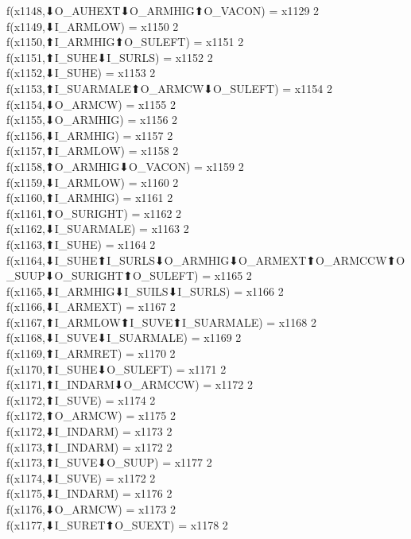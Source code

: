 f(x1148,⬇O_AUHEXT⬇O_ARMHIG⬆O_VACON) = x1129 {2} \\
f(x1149,⬇I_ARMLOW) = x1150 {2} \\
f(x1150,⬆I_ARMHIG⬆O_SULEFT) = x1151 {2} \\
f(x1151,⬆I_SUHE⬇I_SURLS) = x1152 {2} \\
f(x1152,⬇I_SUHE) = x1153 {2} \\
f(x1153,⬆I_SUARMALE⬆O_ARMCW⬇O_SULEFT) = x1154 {2} \\
f(x1154,⬇O_ARMCW) = x1155 {2} \\
f(x1155,⬇O_ARMHIG) = x1156 {2} \\
f(x1156,⬇I_ARMHIG) = x1157 {2} \\
f(x1157,⬆I_ARMLOW) = x1158 {2} \\
f(x1158,⬆O_ARMHIG⬇O_VACON) = x1159 {2} \\
f(x1159,⬇I_ARMLOW) = x1160 {2} \\
f(x1160,⬆I_ARMHIG) = x1161 {2} \\
f(x1161,⬆O_SURIGHT) = x1162 {2} \\
f(x1162,⬇I_SUARMALE) = x1163 {2} \\
f(x1163,⬆I_SUHE) = x1164 {2} \\
f(x1164,⬇I_SUHE⬆I_SURLS⬇O_ARMHIG⬇O_ARMEXT⬆O_ARMCCW⬆O_SUUP⬇O_SURIGHT⬆O_SULEFT) = x1165 {2} \\
f(x1165,⬇I_ARMHIG⬇I_SUILS⬇I_SURLS) = x1166 {2} \\
f(x1166,⬇I_ARMEXT) = x1167 {2} \\
f(x1167,⬆I_ARMLOW⬆I_SUVE⬆I_SUARMALE) = x1168 {2} \\
f(x1168,⬇I_SUVE⬇I_SUARMALE) = x1169 {2} \\
f(x1169,⬆I_ARMRET) = x1170 {2} \\
f(x1170,⬆I_SUHE⬇O_SULEFT) = x1171 {2} \\
f(x1171,⬆I_INDARM⬇O_ARMCCW) = x1172 {2} \\
f(x1172,⬆I_SUVE) = x1174 {2} \\
f(x1172,⬆O_ARMCW) = x1175 {2} \\
f(x1172,⬇I_INDARM) = x1173 {2} \\
f(x1173,⬆I_INDARM) = x1172 {2} \\
f(x1173,⬆I_SUVE⬇O_SUUP) = x1177 {2} \\
f(x1174,⬇I_SUVE) = x1172 {2} \\
f(x1175,⬇I_INDARM) = x1176 {2} \\
f(x1176,⬇O_ARMCW) = x1173 {2} \\
f(x1177,⬇I_SURET⬆O_SUEXT) = x1178 {2} \\
